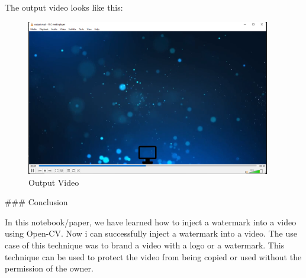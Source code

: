 \documentclass[ebook,12pt,oneside,openany]{memoir}
\begin{document}
The output video looks like this:

\begin{figure}[h!]
\centering
\includegraphics[width=0.95\textwidth]{images/image-2.png}
\caption{Output Video}
\end{figure}

\begin{markdown}
### Conclusion

In this notebook/paper, we have learned how to inject a watermark into a video
using Open-CV. Now i can successfully inject a watermark into a video.
The use case of this technique was to brand a video with a logo or a
watermark. This technique can be used to protect the video from being
copied or used without the permission of the owner.
\end{markdown}
\end{document}
